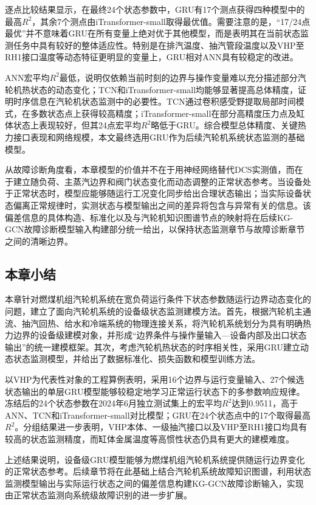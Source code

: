 逐点比较结果显示，在最终24个状态参数中，GRU有17个测点获得四种模型中的最高$R^2$，其余7个测点由iTransformer-small取得最优值。需要注意的是，“17/24点最优”并不意味着GRU在所有变量上绝对优于其他模型，而是表明其在当前状态监测任务中具有较好的整体适应性。特别是在排汽温度、抽汽管段温度以及VHP至RH1接口温度等动态特征更明显的变量上，GRU相对ANN具有较稳定的改进。

ANN宏平均$R^2$最低，说明仅依赖当前时刻的边界与操作变量难以充分描述部分汽轮机热状态的动态变化；TCN和iTransformer-small均能够显著提高总体精度，证明时序信息在汽轮机状态监测中的必要性。TCN通过卷积感受野提取局部时间模式，在多数状态点上获得较高精度；iTransformer-small在部分高精度压力点及缸体状态上表现较好，但其24点宏平均$R^2$略低于GRU。综合模型总体精度、关键热力接口表现和网络规模，本文最终选用GRU作为后续汽轮机系统状态监测的基础模型。

从故障诊断角度看，本章模型的价值并不在于用神经网络替代DCS实测值，而在于建立随负荷、主蒸汽边界和阀门状态变化而动态调整的正常状态参考。当设备处于正常状态时，模型应能够随运行工况变化同步给出合理状态输出；当实际设备状态偏离正常规律时，实测状态与模型输出之间的差异将包含与异常有关的信息。该偏差信息的具体构造、标准化以及与汽轮机知识图谱节点的映射将在后续KG-GCN故障诊断模型输入构建部分统一给出，以保持状态监测章节与故障诊断章节之间的清晰边界。

\subsection{本章小结}

本章针对燃煤机组汽轮机系统在宽负荷运行条件下状态参数随运行边界动态变化的问题，建立了面向汽轮机系统的设备级状态监测建模方法。首先，根据汽轮机主通流、抽汽回热、给水和冷端系统的物理连接关系，将汽轮机系统划分为具有明确热力边界的设备级建模对象，并形成“边界条件与操作量输入—设备内部及出口状态输出”的统一建模框架。其次，考虑汽轮机热状态的时序相关性，采用GRU建立动态状态监测模型，并给出了数据标准化、损失函数和模型训练方法。

以VHP为代表性对象的工程算例表明，采用16个边界与运行变量输入、27个候选状态输出的单层GRU模型能够较稳定地学习正常运行状态下的多参数响应规律。冻结后的24个状态参数在2024年6月独立测试集上的宏平均$R^2$达到0.9511，高于ANN、TCN和iTransformer-small对比模型；GRU在24个状态点中的17个取得最高$R^2$。分组结果进一步表明，VHP本体、一级抽汽接口以及VHP至RH1接口均具有较高的状态监测精度，而缸体金属温度等高惯性状态仍具有更大的建模难度。

上述结果说明，设备级GRU模型能够为燃煤机组汽轮机系统提供随运行边界变化的正常状态参考。后续章节将在此基础上结合汽轮机系统故障知识图谱，利用状态监测模型输出与实际运行状态之间的偏差信息构建KG-GCN故障诊断输入，实现由正常状态监测向系统级故障识别的进一步扩展。
